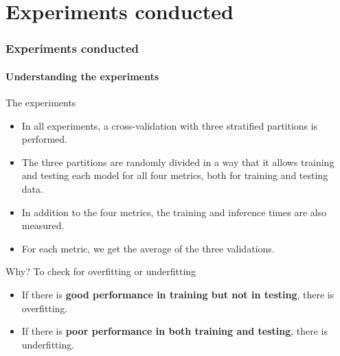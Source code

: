 \section{Experiments conducted} %
\begin{frame}
	\frametitle{Experiments conducted}
	\framesubtitle{Understanding the experiments}
	
	\begin{block}{The experiments} 
		\scriptsize
		
		\begin{itemize}
			\item In all experiments, a cross-validation with three stratified partitions is performed.
			
			\item The three partitions are randomly divided in a way that it allows training and testing each model for all four metrics, both for training and testing data.
			
			\item In addition to the four metrics, the training and inference times are also measured.
			
			\item For each metric, we get the average of the three validations.  
			
			
		\end{itemize}
	\end{block}

	\begin{exampleblock}{Why? To check for overfitting or underfitting} 
	\begin{itemize}
		\item If there is \textbf{good performance in training but not in testing}, there is overfitting.
		
		\item If there is \textbf{poor performance in both training and testing}, there is underfitting.
	\end{itemize}
	\end{exampleblock}
\end{frame}


